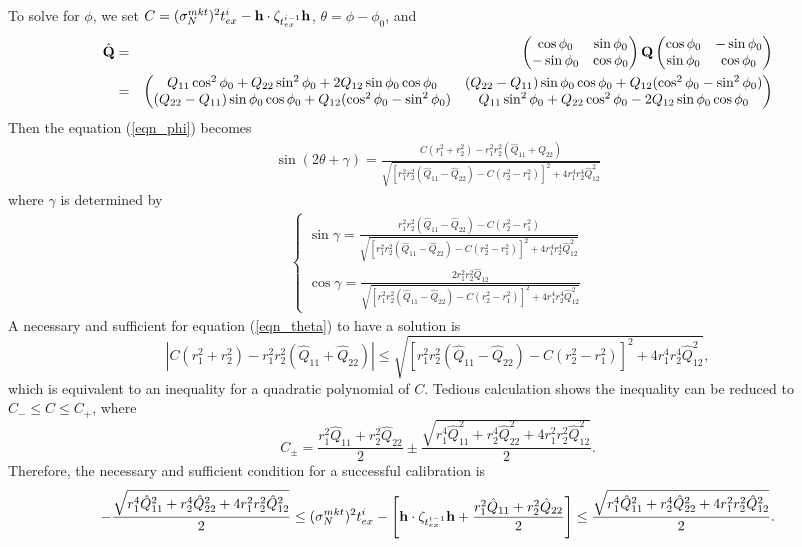 \documentclass[10pt]{article}
\theoremstyle{plain}
\numberwithin{equation}{section}
\numberwithin{table}{section}
\begin{document}
To solve for $\phi$, we set $C=(\sigma_N^{mkt})^2 t_{ex}^i - {\bf h}
\cdot \zeta_{t_{ex}^{i-1}}{\bf h}$, $\theta = \phi - \phi_0$, and
\begin{eqnarray*}
\hat {\bf Q} &=& \left(\begin{matrix}\cos\phi_0 & \sin\phi_0 \\
-\sin\phi_0 & \cos\phi_0 \end{matrix}\right) {\bf Q}
\left(\begin{matrix}\cos\phi_0 & -\sin\phi_0 \\ \sin\phi_0 &
\cos\phi_0 \end{matrix}\right) \\
&=&
\left(
\begin{matrix}
Q_{11}\cos^2\phi_0 + Q_{22} \sin^2\phi_0 + 2Q_{12}\sin\phi_0\cos\phi_0
& (Q_{22}-Q_{11})\sin\phi_0\cos\phi_0 +
Q_{12}(\cos^2\phi_0-\sin^2\phi_0)\\
(Q_{22}-Q_{11})\sin\phi_0\cos\phi_0 +
Q_{12}(\cos^2\phi_0-\sin^2\phi_0) & Q_{11}\sin^2\phi_0 +
Q_{22}\cos^2\phi_0 - 2Q_{12}\sin\phi_0\cos\phi_0
\end{matrix}
\right)
\end{eqnarray*}
Then the equation (\ref{eqn_phi}) becomes
\begin{eqnarray}\label{eqn_theta}
\sin(2\theta + \gamma) = \frac{C(r_1^2+r_2^2)-r_1^2r_2^2(\hat Q_{11} +
\hat Q_{22})}{\sqrt{[r_1^2r_2^2(\hat Q_{11}-\hat Q_{22}) - C(r_2^2 -
r_1^2)]^2+ 4r_1^4r_2^4\hat Q_{12}^2}}
\end{eqnarray}
where $\gamma$ is determined by
\begin{eqnarray}\label{eqn_gamma}
\begin{cases}
\sin\gamma = \frac{r_1^2r_2^2(\hat Q_{11}-\hat Q_{22}) - C(r_2^2 -
r_1^2)}{\sqrt{[r_1^2r_2^2(\hat Q_{11}-\hat Q_{22}) - C(r_2^2 -
r_1^2)]^2+ 4r_1^4r_2^4\hat Q_{12}^2}} \\
\cos\gamma = \frac{2r_1^2r_2^2\hat Q_{12}}{\sqrt{[r_1^2r_2^2(\hat
Q_{11}-\hat Q_{22}) - C(r_2^2 - r_1^2)]^2+ 4r_1^4r_2^4\hat Q_{12}^2}}
\end{cases}
\end{eqnarray}
A necessary and sufficient for equation (\ref{eqn_theta}) to have a solution is
\[
\left| C(r_1^2+r_2^2)-r_1^2r_2^2(\hat Q_{11} + \hat Q_{22}) \right|
\le \sqrt{[r_1^2r_2^2(\hat Q_{11}-\hat Q_{22}) - C(r_2^2 - r_1^2)]^2+
4r_1^4r_2^4\hat Q_{12}^2},
\]
which is equivalent to an inequality for a quadratic polynomial of
$C$. Tedious calculation shows the inequality can be reduced to $C_-
\le C \le C_+$, where
\[
C_{\pm} = \frac{r_1^2\hat Q_{11} + r_2^2 \hat Q_{22}}{2} \pm
\frac{\sqrt{r_1^4\hat Q_{11}^2 + r_2^4\hat Q_{22}^2 + 4r_1^2r_2^2\hat
Q_{12}^2}}{2}.
\]
Therefore, the necessary and sufficient condition for a successful
calibration is
\[
 - \frac{\sqrt{r_1^4\hat Q_{11}^2 + r_2^4\hat Q_{22}^2 +
4r_1^2r_2^2\hat Q_{12}^2}}{2}\le (\sigma_N^{mkt})^2t_{ex}^i - \left[
{\bf h} \cdot \zeta_{t^{i-1}_{ex}} {\bf h} + \frac{r_1^2\hat Q_{11} +
r_2^2 \hat Q_{22}}{2} \right] \le  \frac{\sqrt{r_1^4\hat Q_{11}^2 +
r_2^4\hat Q_{22}^2 + 4r_1^2r_2^2\hat Q_{12}^2}}{2}.
\]
\end{document}
